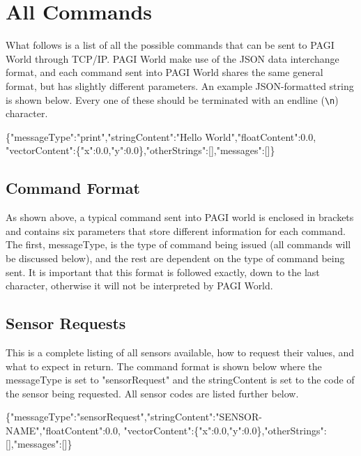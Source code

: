 \pagebreak

\section{All Commands}

What follows is a list of all the possible commands that can be sent to PAGI World through TCP/IP. PAGI World make use of the JSON data interchange format, and each command sent into PAGI World shares the same general format, but has slightly different parameters. An example JSON-formatted string is shown below. Every one of these should be terminated with an endline (\texttt{\textbackslash n}) character.

\begin{center}
	{\scriptsize \{"messageType":"print","stringContent":"Hello World","floatContent":0.0,
		"vectorContent":\{"x":0.0,"y":0.0\},"otherStrings":[],"messages":[]\}}
\end{center}

\subsection{Command Format}

As shown above, a typical command sent into PAGI world is enclosed in brackets and contains six parameters that store different information for each command. The first, messageType, is the type of command being issued (all commands will be discussed below), and the rest are dependent on the type of command being sent. It is important that this format is followed exactly, down to the last character, otherwise it will not be interpreted by PAGI World. 

\subsection{Sensor Requests}

This is a complete listing of all sensors available, how to request their values, and what to expect in return.
\noindent The command format is shown below where the messageType is set to "sensorRequest" and the stringContent is set to the code of the sensor being requested. All sensor codes are listed further below.
\begin{center}
	{\scriptsize \{"messageType":"sensorRequest","stringContent":"SENSOR-NAME","floatContent":0.0,
		"vectorContent":\{"x":0.0,"y":0.0\},"otherStrings":[],"messages":[]\}}
\end{center}

